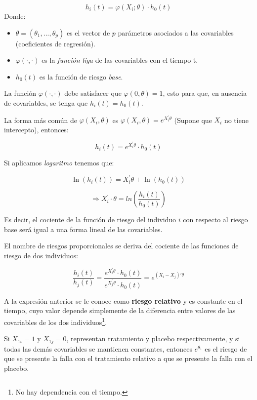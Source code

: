 \documentclass[
  a4paper,
  oneside,
  openany]{book}
\providecommand{\tightlist}{%
  \setlength{\itemsep}{0pt}\setlength{\parskip}{0pt}}
\begin{document}
\[
h_i(t) = \varphi(X_i ;\theta)\cdot h_0(t)
\]
Donde:

\begin{itemize}
\tightlist
\item
  \(\theta=(\theta_1,..., \theta_p)\) es el vector de \(p\) parámetros asociados a las covariables (coeficientes de regresión).
\item
  \(\varphi(\cdot,\cdot)\) es la \emph{función liga} de las covariables con el tiempo t.
\item
  \(h_{0}(t)\) es la función de riesgo \emph{base}.
\end{itemize}

La función \(\varphi(\cdot,\cdot)\) debe satisfacer que \(\varphi(0,\theta) =1\), esto para que, en ausencia de covariables, se tenga que \(h_i(t) = h_0(t)\).

La forma más común de \(\varphi(X_i, \theta)\) es \(\varphi(X_i, \theta) = e^{X_i^{'} \theta}\) (Supone que \(X_i\) no tiene intercepto), entonces:

\[
h_i(t) = e^{X_i^{'} \theta}\cdot h_0(t)
\]

Si aplicamos \emph{logaritmo} tenemos que:

\[
\ln(h_i(t)) = X_i^{'}\theta + \ln(h_0(t))
\]

\begin{equation}
\Longrightarrow X_i^{'}\cdot\theta = ln \left({\frac{h_i(t)}{h_0(t)}}\right)
\label{eq:cox-covariables-linear}
\end{equation}

Es decir, el cociente de la función de riesgo del individuo \(i\) con respecto al riesgo base será igual a una forma lineal de las covariables.

El nombre de riesgos proporcionales se deriva del cociente de las funciones de riesgo de dos individuos:

\[
\frac{h_i(t)}{h_j(t)} = \frac{e^{X_i^{'} \theta}\cdot h_0(t)}{e^{X_j^{'} \theta} \cdot h_0(t)} = e^{(X_i-X_j)' \theta}
\]

A la expresión anterior se le conoce como \textbf{riesgo relativo} y es constante en el tiempo, cuyo valor depende simplemente de la diferencia entre valores de las covariables de los dos individuos\footnote{No hay dependencia con el tiempo.}.

Si \(X_{1i} = 1\) y \(X_{1j} = 0\), representan tratamiento y placebo respectivamente, y si todas las demás covariables se mantienen constantes, entonces \(e^{\theta_1}\) es el riesgo de que se presente la falla con el tratamiento relativo a que se presente la falla con el placebo.
\end{document}
